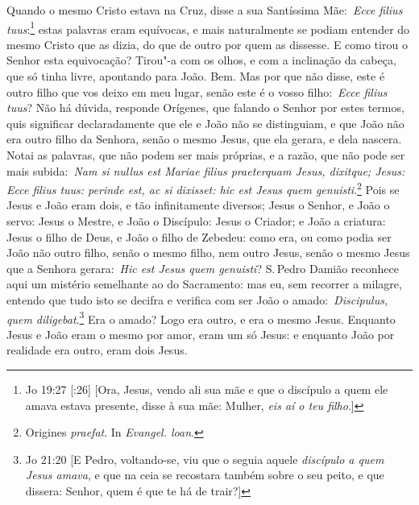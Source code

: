 Quando o mesmo Cristo estava na Cruz, disse a sua Santíssima
Mãe:~\emph{Ecce filius tuus}:\footnote{Jo 19:27 [:26] [Ora, Jesus, vendo ali sua mãe e que o discípulo a quem ele amava estava presente, disse à sua mãe: Mulher, \textit{eis aí o teu filho}.]} estas palavras eram
equívocas, e mais naturalmente se podiam entender do mesmo Cristo que as
dizia, do que de outro por quem as dissesse. E como tirou o Senhor esta
equivocação? Tirou"-a com os olhos, e com a inclinação da cabeça, que só
tinha livre, apontando para João. Bem. Mas por que não disse, este é
outro filho que vos deixo em meu lugar, senão este é o vosso
filho:~\emph{Ecce filius tuus}? Não há dúvida, responde Orígenes, que
falando o Senhor por estes termos, quis significar declaradamente que
ele e João não se distinguiam, e que João não era outro filho da
Senhora, senão o mesmo Jesus, que ela gerara, e dela nascera. Notai as
palavras, que não podem ser mais próprias, e a razão, que não pode ser
mais subida:~\emph{Nam si nullus est Mariae filius praeterquam Jesus,
dixitque; Jesus: Ecce filius tuus: perinde est, ac si dixisset: hic est
Jesus quem genuisti}.\footnote{Origines \textit{praefat}. In \textit{Evangel. loan}.} Pois se Jesus e João eram dois,
e tão infinitamente diversos; Jesus o Senhor, e João o servo: Jesus o
Mestre, e João o Discípulo: Jesus o Criador; e João a criatura: Jesus o
filho de Deus, e João o filho de Zebedeu: como era, ou como podia ser
João não outro filho, senão o mesmo filho, nem outro Jesus, senão o
mesmo Jesus que a Senhora gerara:~\emph{Hic est Jesus quem genuisti}? S.\,Pedro Damião reconhece aqui um mistério semelhante ao do Sacramento: mas
eu, sem recorrer a milagre, entendo que tudo isto se decifra e verifica
com ser João o amado:~\emph{Discipulus, quem
diligebat}.\footnote{Jo 21:20 [E Pedro, voltando-se, viu que o seguia aquele \textit{discípulo a quem Jesus amava}, e que na ceia se recostara também sobre o seu peito, e que dissera: Senhor, quem é que te há de trair?]} Era o amado? Logo era outro, e era o mesmo
Jesus. Enquanto Jesus e João eram o mesmo por amor, eram um só Jesus: e
enquanto João por realidade era outro, eram dois Jesus.


